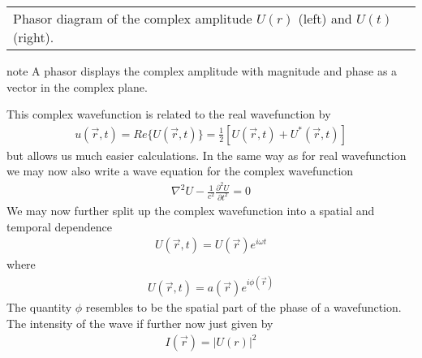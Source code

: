 \documentclass[letterpaper,10pt,english]{sphinxmanual}
\begin{document}
\begin{savenotes}\sphinxattablestart
\centering
\begin{tabulary}{\linewidth}[t]{|T|}
\hline
\sphinxstyletheadfamily 
{}
\\
\hline
{} Phasor diagram of the complex amplitude \(U(r)\) (left) and \(U(t)\) (right).
\\
\hline
\end{tabulary}
\par
\sphinxattableend\end{savenotes}

\begin{sphinxadmonition}{note}{}\unskip
A phasor displays the complex amplitude with magnitude and phase as a vector in the complex plane.
\end{sphinxadmonition}

This complex wavefunction is related to the real wavefunction by
\begin{equation*}
\begin{split}u(\vec{r},t)=Re\lbrace U(\vec{r},t)\rbrace=\frac{1}{2}\left [ U(\vec{r},t)+U^*(\vec{r},t)\right ]\end{split}
\end{equation*}
but allows us much easier calculations. In the same way as for real wavefunction we may now also write a wave equation for the complex wavefunction
\begin{equation*}
\begin{split}\nabla^2 U - \frac{1}{c^2}\frac{\partial^2 U}{\partial t^2}=0\end{split}
\end{equation*}
We may now further split up the complex wavefunction into a spatial and temporal dependence
\begin{equation*}
\begin{split}U(\vec{r},t)=U(\vec{r})e^{i\omega t}\end{split}
\end{equation*}
where
\begin{equation*}
\begin{split}U(\vec{r},t)=a(\vec{r})e^{i\phi(\vec{r})}\end{split}
\end{equation*}
The quantity \(\phi\) resembles to be the spatial part of the phase of a wavefunction. The intensity of the wave if further now just given by
\begin{equation*}
\begin{split}I(\vec{r})=|U(r)|^2\end{split}
\end{equation*}
\end{document}
